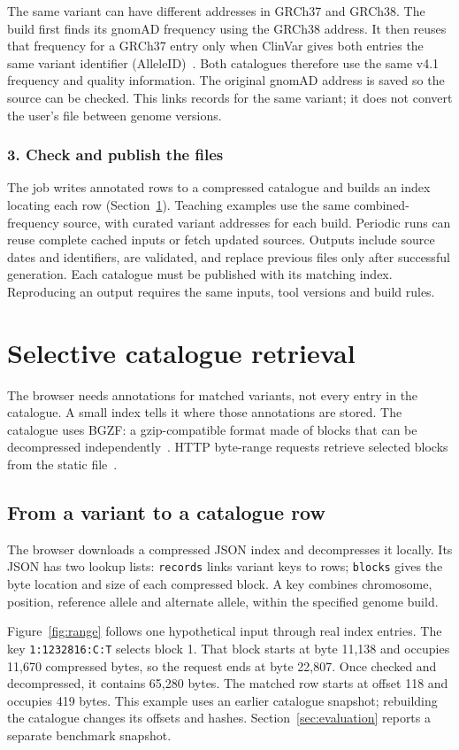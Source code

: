 \documentclass[10pt,twocolumn,letterpaper]{article}
\newcommand{\code}[1]{\texttt{\small #1}}
\begin{document}
The same variant can have different addresses in GRCh37 and GRCh38. The build first finds its gnomAD frequency using the GRCh38 address. It then reuses that frequency for a GRCh37 entry only when ClinVar gives both entries the same variant identifier (AlleleID)~\cite{clinvarids}. Both catalogues therefore use the same v4.1 frequency and quality information. The original gnomAD address is saved so the source can be checked. This links records for the same variant; it does not convert the user's file between genome versions.

\subsubsection*{3. Check and publish the files}
The job writes annotated rows to a compressed catalogue and builds an index locating each row (Section~\ref{sec:retrieval}). Teaching examples use the same combined-frequency source, with curated variant addresses for each build. Periodic runs can reuse complete cached inputs or fetch updated sources. Outputs include source dates and identifiers, are validated, and replace previous files only after successful generation. Each catalogue must be published with its matching index. Reproducing an output requires the same inputs, tool versions and build rules.

\section{Selective catalogue retrieval}
\label{sec:retrieval}
The browser needs annotations for matched variants, not every entry in the catalogue. A small index tells it where those annotations are stored. The catalogue uses BGZF: a gzip-compatible format made of blocks that can be decompressed independently~\cite{bgzf}. HTTP byte-range requests retrieve selected blocks from the static file~\cite{http}.

\subsection{From a variant to a catalogue row}
The browser downloads a compressed JSON index and decompresses it locally. Its JSON has two lookup lists: \code{records} links variant keys to rows; \code{blocks} gives the byte location and size of each compressed block. A key combines chromosome, position, reference allele and alternate allele, within the specified genome build.

Figure~\ref{fig:range} follows one hypothetical input through real index entries. The key \code{1:1232816:C:T} selects block 1. That block starts at byte 11,138 and occupies 11,670 compressed bytes, so the request ends at byte 22,807. Once checked and decompressed, it contains 65,280 bytes. The matched row starts at offset 118 and occupies 419 bytes. This example uses an earlier catalogue snapshot; rebuilding the catalogue changes its offsets and hashes. Section~\ref{sec:evaluation} reports a separate benchmark snapshot.
\end{document}
